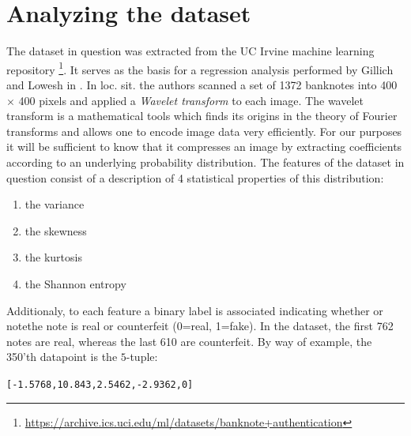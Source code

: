 \documentclass[14pt]{article}
\theoremstyle{plain}
\theoremstyle{definition}
\begin{document}
\section{Analyzing the dataset}
The dataset in question was extracted from the UC Irvine machine learning repository \footnote{\url{https://archive.ics.uci.edu/ml/datasets/banknote+authentication}}. It serves as the basis for a regression analysis performed by Gillich and Lowesh in \cite{BNA}. In loc. sit. the authors scanned a set of 1372 banknotes into 400$\times$ 400 pixels  and applied a \emph{Wavelet transform} to each image. The wavelet transform is a mathematical tools which finds its origins in the theory of Fourier transforms and allows one to encode image data very efficiently. For our purposes it will be sufficient to know that it compresses an image by extracting coefficients according to an underlying probability distribution. The features of the dataset in question consist of a description of 4 statistical properties of this distribution:
\begin{enumerate}
\item the variance
\item the skewness
\item the kurtosis	
\item the Shannon entropy
\end{enumerate}
Additionaly, to each feature a binary label is associated indicating whether or notethe note is real or counterfeit (0=real, 1=fake). In the dataset, the first 762 notes are real, whereas the last 610 are counterfeit. By way of example, the 350'th datapoint is the $5$-tuple:

\begin{center}
\texttt{[-1.5768,10.843,2.5462,-2.9362,0]
}	
\end{center}
\end{document}
